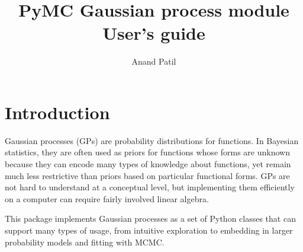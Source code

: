 \documentclass[]{manual}
\title{PyMC Gaussian process module \\User's guide}
\author{ Anand Patil }
\begin{document}
 

\maketitle

\tableofcontents

\chapter{Introduction}\label{cha:introduction} %

Gaussian processes (GPs) are probability distributions for functions. In Bayesian statistics, they are often used as priors for functions whose forms are unknown because they can encode many types of knowledge about functions, yet remain much less restrictive than priors based on particular functional forms. GPs are not hard to understand at a conceptual level, but implementing them efficiently on a computer can require fairly involved linear algebra.

This package implements Gaussian processes as a set of Python classes that can support many types of usage, from intuitive exploration to embedding in larger probability models and fitting with MCMC.
\end{document}

